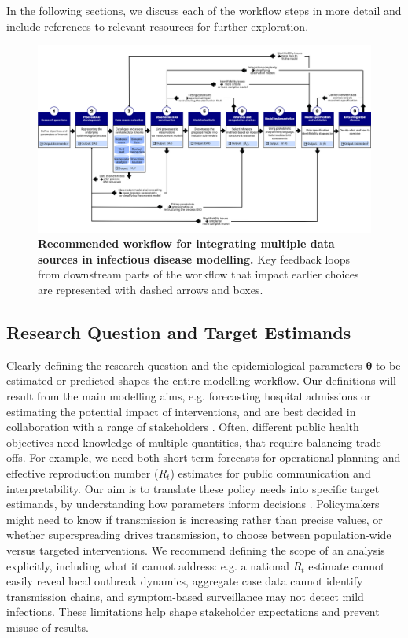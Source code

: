\documentclass{article}
\begin{document}
In the following sections, we discuss each of the workflow steps in more detail and include references to relevant resources for further exploration.

\begin{landscape}
\begin{figure}[htbp]
    \centering
    \includegraphics[width = 1.4 \textwidth]{figures/Abbott et al figure 2.png}
    \caption{\textbf{Recommended workflow for integrating multiple data sources in infectious disease modelling.} Key feedback loops from downstream parts of the workflow that impact earlier choices are represented with dashed arrows and boxes.}
    \label{fig:workflow}
\end{figure}
\end{landscape}

\subsection{Research Question and Target Estimands} \label{sec:research-question}

Clearly defining the research question and the epidemiological parameters $\boldsymbol{\theta}$ to be estimated or predicted shapes the entire modelling workflow. Our definitions will result from the main modelling aims, e.g. forecasting hospital admissions or estimating the potential impact of interventions, and are best decided in collaboration with a range of stakeholders \citep{marshall2024when}.
Often, different public health objectives need knowledge of multiple quantities, that require balancing trade-offs. For example, we need both short-term forecasts for operational planning and effective reproduction number ($R_t$) estimates for public communication and interpretability. Our aim is to translate these policy needs into specific target estimands, by understanding how parameters inform decisions \citep{nicholson2022interoperability, who-mosaic-2023}. Policymakers might need to know if transmission is increasing rather than precise values, or whether superspreading drives transmission, to choose between population-wide versus targeted interventions. We recommend defining the scope of an analysis explicitly, including what it cannot address: e.g. a national $R_t$ estimate cannot easily reveal local outbreak dynamics, aggregate case data cannot identify transmission chains, and symptom-based surveillance may not detect mild infections.
These limitations help shape stakeholder expectations and prevent misuse of results.
\end{document}
